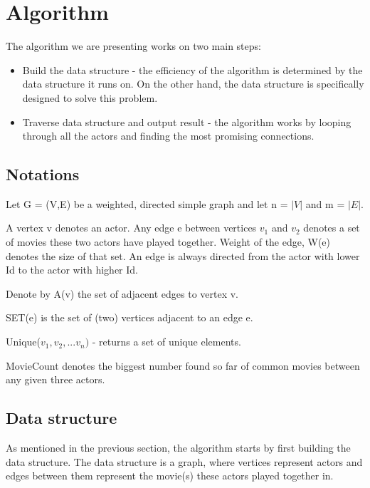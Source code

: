 \section{Algorithm}
\label{Algorithm}

The algorithm we are presenting works on two main steps:
\begin{itemize}
  \item Build the data structure - the efficiency of the algorithm is determined by the data structure it runs on. On the other hand, the data structure is specifically designed to solve this problem.
  \item Traverse data structure and output result - the algorithm works by looping through all the actors and finding the most promising connections.
\end{itemize} 

\subsection{Notations}
Let G = (V,E) be a weighted, directed simple graph and let n = \(\lvert V\rvert\) and m = \(\lvert E\rvert\).

A vertex v denotes an actor. Any edge e between vertices \(v_1\) and \(v_2\) denotes a set of movies these two actors have played together. Weight of the edge, W(e) denotes the size of that set. An edge is always directed from the actor with lower Id to the actor with higher Id.

Denote by A(v) the set of adjacent edges to vertex v.

SET(e) is the set of (two) vertices adjacent to an edge e.

Unique(\(v_1, v_2,... v_n)\) - returns a set of unique elements.

MovieCount denotes the biggest number found so far of common movies between any given three actors.

\subsection{Data structure}
As mentioned in the previous section, the algorithm starts by first building the data structure. The data structure is a graph, where vertices represent actors and edges between them represent the movie(s) these actors played together in. 

